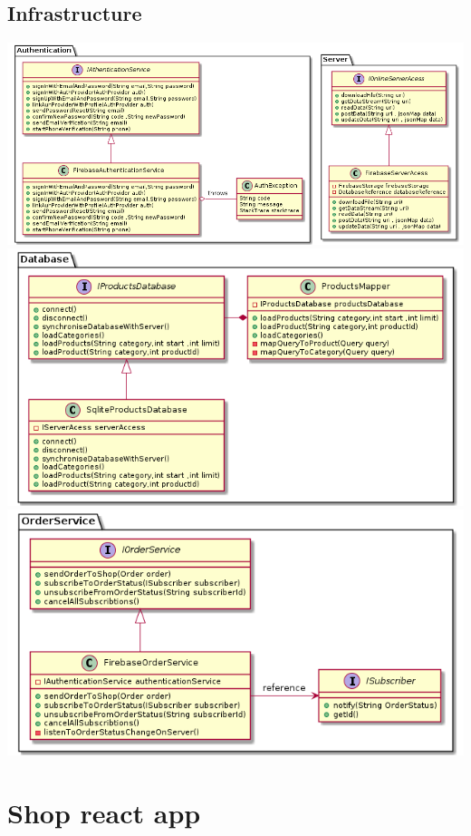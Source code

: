 \documentclass{article}
\begin{document}
\subsection{Infrastructure}
\includegraphics[scale=0.5]{./out/MobileApp/Infrastructure/infra.png}
\includegraphics[scale=0.5]{./out/MobileApp/Infrastructure/infra3.png}\\
\includegraphics[scale=0.5]{./out/MobileApp/Infrastructure/infra2.png}
 
\section{Shop react app}
\end{document}
